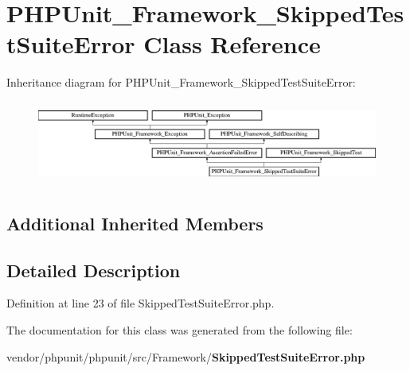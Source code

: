 \section{P\+H\+P\+Unit\+\_\+\+Framework\+\_\+\+Skipped\+Test\+Suite\+Error Class Reference}
\label{class_p_h_p_unit___framework___skipped_test_suite_error}
Inheritance diagram for P\+H\+P\+Unit\+\_\+\+Framework\+\_\+\+Skipped\+Test\+Suite\+Error\+:\begin{figure}[H]
\begin{center}
\leavevmode
\includegraphics[height=2.775713cm]{class_p_h_p_unit___framework___skipped_test_suite_error}
\end{center}
\end{figure}
\subsection*{Additional Inherited Members}


\subsection{Detailed Description}


Definition at line 23 of file Skipped\+Test\+Suite\+Error.\+php.



The documentation for this class was generated from the following file\+:\begin{DoxyCompactItemize}
\item 
vendor/phpunit/phpunit/src/\+Framework/{\bf Skipped\+Test\+Suite\+Error.\+php}\end{DoxyCompactItemize}
